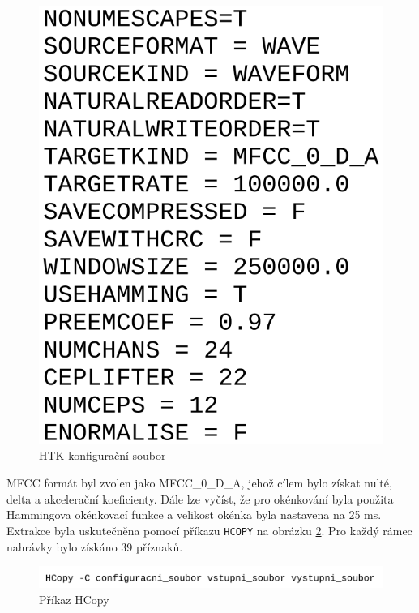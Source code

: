 \documentclass[FM,BP]{tulthesis}
\begin{document}
\begin{figure}[htbp]
\centerline{\includegraphics[scale=.22,keepaspectratio]{htk_config.png}}
\caption{HTK konfigurační soubor}
\label{fig:htk_config}
\end{figure}
\FloatBarrier

MFCC formát byl zvolen jako MFCC\_0\_D\_A, jehož cílem bylo získat nulté, delta a akcelerační koeficienty. Dále lze vyčíst, že pro okénkování byla použita Hammingova okénkovací funkce a velikost okénka byla nastavena na 25 ms. Extrakce byla uskutečněna pomocí příkazu \texttt{\mbox{HCOPY}} na obrázku \mbox{\ref{fig:htk}}. Pro každý rámec nahrávky bylo získáno 39 příznaků.

\begin{figure}[htbp]
\centerline{\includegraphics[scale=.22,keepaspectratio]{htk_command.png}}
\caption{Příkaz HCopy}
\label{fig:htk}
\end{figure}
\FloatBarrier
\end{document}
